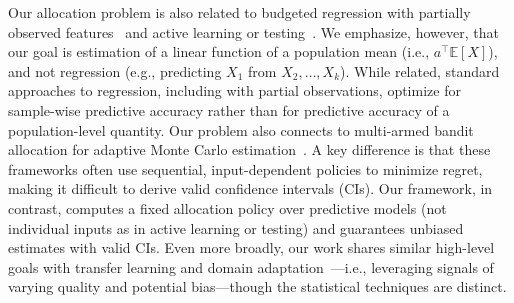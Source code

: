 \documentclass{article} %
\newcommand{\Ex}{\mathbb{E}}
\renewcommand{\cite}{\citep}
\newcommand{\alekh}[1]{ {\color{brown}[AA: #1]}}
\begin{document}
Our allocation problem is also related to budgeted regression with partially observed features~\cite{JMLR:v12:cesa-bianchi11a, hazan2012linear} and active learning or testing~\cite{settles2009active, activetesting, zhang2015active}. We emphasize, however, that our goal is estimation of a linear function of a population mean (i.e., $a^\top\Ex[X]$), and not regression (e.g., predicting $X_1$ from $X_2, \ldots, X_k$). While related, standard approaches to regression, including with partial observations, optimize for sample-wise predictive accuracy rather than for predictive accuracy of a population-level quantity. Our problem also connects to multi-armed bandit allocation for adaptive Monte Carlo estimation~\cite{pmlr-v32-neufeld14}. A key difference is that these frameworks often use sequential, input-dependent policies to minimize regret, making it difficult to derive valid confidence intervals (CIs). Our framework, in contrast, computes a fixed allocation policy over predictive models (not individual inputs as in active learning or testing) and guarantees unbiased estimates with valid CIs. Even more broadly, our work shares similar high-level goals with transfer learning and domain adaptation~\cite[][\emph{inter alia}]{Pan2010ASO, bendavid2010theory}---i.e., leveraging signals of varying quality and potential bias---though the statistical techniques are distinct.

 

\end{document}
